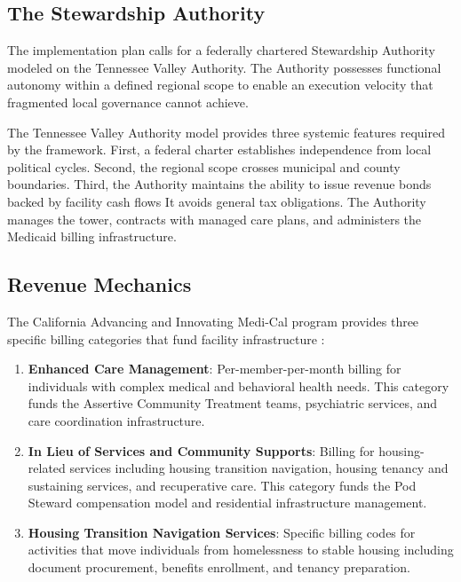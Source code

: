 \documentclass[12pt, letterpaper]{article}
\begin{document}
\subsection{The Stewardship Authority}

The implementation plan calls for a federally chartered Stewardship Authority modeled on the Tennessee Valley Authority. The Authority possesses functional autonomy within a defined regional scope to enable an execution velocity that fragmented local governance cannot achieve.

The Tennessee Valley Authority model provides three systemic features required by the framework. First, a federal charter establishes independence from local political cycles. Second, the regional scope crosses municipal and county boundaries. Third, the Authority maintains the ability to issue revenue bonds backed by facility cash flows It avoids general tax obligations. The Authority manages the tower, contracts with managed care plans, and administers the Medicaid billing infrastructure.

\subsection{Revenue Mechanics}

The California Advancing and Innovating Medi-Cal program provides three specific billing categories that fund facility infrastructure \citep{dhcs_calaim_2024, californiacoalition_2024}:

\begin{enumerate}
    \item \textbf{Enhanced Care Management}: Per-member-per-month billing for individuals with complex medical and behavioral health needs. This category funds the Assertive Community Treatment teams, psychiatric services, and care coordination infrastructure.
    \item \textbf{In Lieu of Services and Community Supports}: Billing for housing-related services including housing transition navigation, housing tenancy and sustaining services, and recuperative care. This category funds the Pod Steward compensation model and residential infrastructure management.
    \item \textbf{Housing Transition Navigation Services}: Specific billing codes for activities that move individuals from homelessness to stable housing including document procurement, benefits enrollment, and tenancy preparation.
\end{enumerate}
\end{document}
